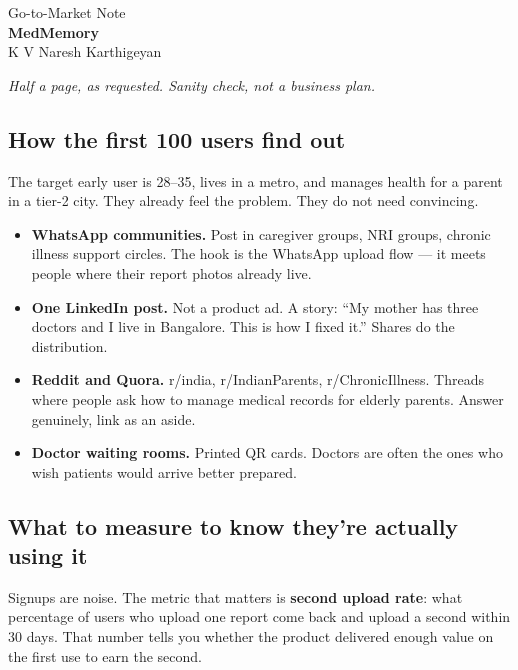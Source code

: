 \documentclass[11pt, a4paper]{article}
\begin{document}
\begin{center}
  {\large Go-to-Market Note}\\[6pt]
  {\large\textbf{MedMemory}}\\[4pt]
  {\small K V Naresh Karthigeyan}
\end{center}

\vspace{3pt}

\textit{Half a page, as requested. Sanity check, not a business plan.}

\subsection*{How the first 100 users find out}

The target early user is 28--35, lives in a metro, and manages health for a parent in a tier-2 city. They already feel the problem. They do not need convincing.

\begin{itemize}
  \item \textbf{WhatsApp communities.} Post in caregiver groups, NRI groups, chronic illness support circles. The hook is the WhatsApp upload flow --- it meets people where their report photos already live.
  \item \textbf{One LinkedIn post.} Not a product ad. A story: ``My mother has three doctors and I live in Bangalore. This is how I fixed it.'' Shares do the distribution.
  \item \textbf{Reddit and Quora.} r/india, r/IndianParents, r/ChronicIllness. Threads where people ask how to manage medical records for elderly parents. Answer genuinely, link as an aside.
  \item \textbf{Doctor waiting rooms.} Printed QR cards. Doctors are often the ones who wish patients would arrive better prepared.
\end{itemize}

\subsection*{What to measure to know they're actually using it}

Signups are noise. The metric that matters is \textbf{second upload rate}: what percentage of users who upload one report come back and upload a second within 30 days. That number tells you whether the product delivered enough value on the first use to earn the second.
\end{document}
